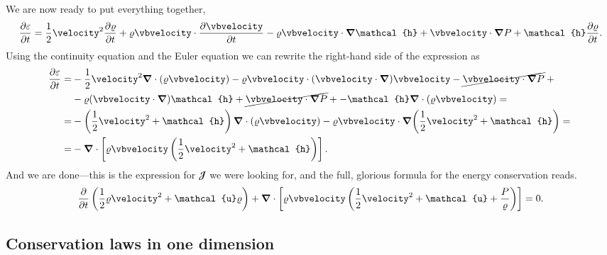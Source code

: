 We are now ready to put everything together,
\begin{align*}
  \pdv{\varepsilon}{t} =
  \frac{1}{2} \velocity^2 \pdv{\density}{t} + \density \vbvelocity \cdot \pdv{\vbvelocity}{t}
  -\density\vbvelocity \cdot \grad{\mathcal{h}} + \vbvelocity \cdot \grad{\pressure} +
  \mathcal{h} \pdv{\density}{t}.
\end{align*}
Using the continuity equation and the Euler equation we can rewrite the right-hand
side of the expression as
\begin{align*}
  \pdv{\varepsilon}{t} = &
  -\frac{1}{2}\velocity^2 \vnabla \cdot (\density \vbvelocity)
  - \density \vbvelocity \cdot (\vbvelocity \cdot \grad) \vbvelocity
  - \cancel{\vbvelocity \cdot \grad{\pressure}} + \mathcal{}\\
  & -\density(\vbvelocity \cdot \grad) \mathcal{h}
  + \cancel{\vbvelocity \cdot \grad{\pressure}} +
  - \mathcal{h} \vnabla \cdot (\density \vbvelocity) = \mathcal{}\\
  = & - \left( \frac{1}{2} \velocity^2 + \mathcal{h} \right) \vnabla \cdot (\density \vbvelocity)
  - \density \vbvelocity \cdot \grad(\frac{1}{2} \velocity^2 + \mathcal{h}) = \mathcal{}\\
  = & - \vnabla \cdot \left[
    \density \vbvelocity \left( \frac{1}{2} \velocity^2 + \mathcal{h} \right)
    \right]\mathcal{}.
\end{align*}
And we are done---this is the expression for $\mathbfcal{J}$ we were looking for,
and the full, glorious formula for the energy conservation reads.
\begin{align}\label{eq:nrf_energy_conservation}
  \pdv{t} \left( \frac{1}{2}\density \velocity^2 + \mathcal{u} \density \right) +
  \vnabla \cdot \left[ \density \vbvelocity
  \left( \frac{1}{2} \velocity^2 + \mathcal{u} + \frac{\pressure}{\density} \right)\right] = 0.
\end{align}



\subsection{Conservation laws in one dimension}

